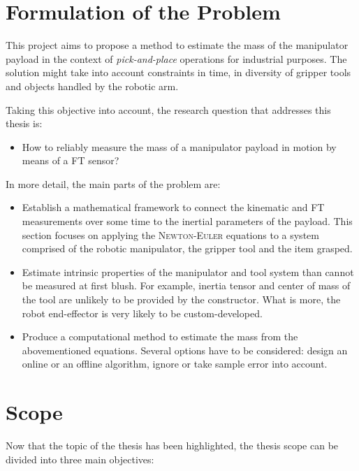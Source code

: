 \documentclass[/home/francois/latex/report/main.tex]{subfiles}
\begin{document}
\section{Formulation of the Problem}

This project aims to propose a method to estimate the mass of the manipulator payload in the context of \textit{pick-and-place} operations for industrial purposes. The solution might take into account constraints in time, in diversity of gripper tools and objects handled by the robotic arm.

Taking this objective into account, the research question that addresses this thesis is:

\begin{itemize}%
  \renewcommand{\labelitemi}{$\Rightarrow$}
 \item How to reliably measure the mass of a manipulator payload in motion by means of a \ac{FT} sensor?
\end{itemize}

In more detail, the main parts of the problem are:

\begin{itemize}
 \item Establish a mathematical framework to connect the kinematic and \ac{FT} measurements over some time to the inertial parameters of the payload. This section focuses on applying the \textsc{Newton-Euler} equations to a system comprised of the robotic manipulator, the gripper tool and the item grasped.
 \item Estimate intrinsic properties of the manipulator and tool system than cannot be measured at first blush. For example, inertia tensor and center of mass of the tool are unlikely to be provided by the constructor. What is more, the robot end-effector is very likely to be custom-developed.
 \item Produce a computational method to estimate the mass from the abovementioned equations. Several options have to be considered: design an online or an offline algorithm, ignore or take sample error into account.
\end{itemize}

\section{Scope}

Now that the topic of the thesis has been highlighted, the thesis scope can be divided into three main objectives:
\end{document}
